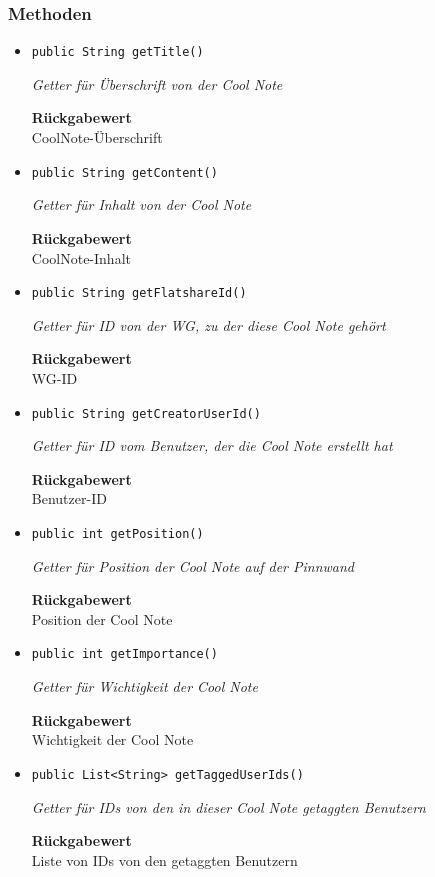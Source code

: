     \subsubsection*{Methoden}
    \begin{itemize}
    	\item{\texttt{public String getTitle()}}
    	
    	\textit{Getter für Überschrift von der Cool Note}
    	
    	
    	
    	\textbf{Rückgabewert} \\
    	CoolNote-Überschrift        \item{\texttt{public String getContent()}}
    	
    	\textit{Getter für Inhalt von der Cool Note}
    	
    	
    	
    	\textbf{Rückgabewert} \\
    	CoolNote-Inhalt        \item{\texttt{public String getFlatshareId()}}
    	
    	\textit{Getter für ID von der WG, zu der diese Cool Note gehört}
    	
    	
    	
    	\textbf{Rückgabewert} \\
    	WG-ID        \item{\texttt{public String getCreatorUserId()}}
    	
    	\textit{Getter für ID vom Benutzer, der die Cool Note erstellt hat}
    	
    	
    	
    	\textbf{Rückgabewert} \\
    	Benutzer-ID        \item{\texttt{public int getPosition()}}
    	
    	\textit{Getter für Position der Cool Note auf der Pinnwand}
    	
    	
    	
    	\textbf{Rückgabewert} \\
    	Position der Cool Note        \item{\texttt{public int getImportance()}}
    	
    	\textit{Getter für Wichtigkeit der Cool Note}
    	
    	
    	
    	\textbf{Rückgabewert} \\
    	Wichtigkeit der Cool Note        \item{\texttt{public List<String> getTaggedUserIds()}}
    	
    	\textit{Getter für IDs von den in dieser Cool Note getaggten Benutzern}
    	
    	
    	
    	\textbf{Rückgabewert} \\
    	Liste von IDs von den getaggten Benutzern
    \end{itemize}
